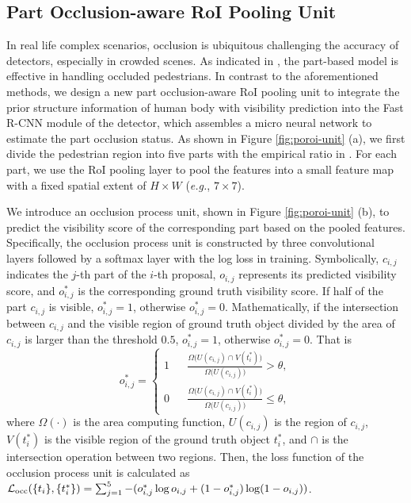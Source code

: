\documentclass[runningheads]{llncs}
\def\eg{{\em e.g.}}
\begin{document}
\subsection{Part Occlusion-aware RoI Pooling Unit}
\label{sec:poroi-unit}
In real life complex scenarios, occlusion is ubiquitous challenging the accuracy of detectors, especially in crowded scenes. As indicated in \cite{DBLP:conf/cvpr/OuyangW12,DBLP:conf/iccv/TianLWT15,DBLP:conf/iccv/ZhouY17}, the part-based model is effective in handling occluded pedestrians. In contrast to the aforementioned methods, we design a new part occlusion-aware RoI pooling unit to integrate the prior structure information of human body with visibility prediction into the Fast R-CNN module of the detector, which assembles a micro neural network to estimate the part occlusion status. As shown in Figure \ref{fig:poroi-unit} (a), we first divide the pedestrian region into five parts with the empirical ratio in \cite{DBLP:journals/pami/FelzenszwalbGMR10}. For each part, we use the RoI pooling layer \cite{DBLP:conf/iccv/Girshick15} to pool the features into a small feature map with a fixed spatial extent of $H\times{W}$ (\eg, $7\times7$).

We introduce an occlusion process unit, shown in Figure \ref{fig:poroi-unit} (b), to predict the visibility score of the corresponding part based on the pooled features. Specifically, the occlusion process unit is constructed by three convolutional layers followed by a softmax layer with the log loss in training. Symbolically, $c_{i,j}$ indicates the $j$-th part of the $i$-th proposal, $o_{i,j}$ represents its predicted visibility score, and $o_{i,j}^\ast$ is the corresponding ground truth visibility score. If half of the part $c_{i,j}$ is visible, $o_{i,j}^\ast=1$, otherwise $o_{i,j}^\ast=0$. Mathematically, if the intersection between $c_{i,j}$ and the visible region of ground truth object divided by the area of $c_{i,j}$ is larger than the threshold $0.5$, $o_{i,j}^\ast=1$, otherwise $o_{i,j}^\ast=0$. That is
\begin{equation}
o_{i,j}^\ast=\left\{
\begin{aligned}
1&    &\frac{\Omega\big(U(c_{i,j})\cap{V(t_i^\ast)}\big)}{\Omega\big(U(c_{i,j})\big)}>\theta, \\
0&    &\frac{\Omega\big(U(c_{i,j})\cap{V(t_i^\ast)}\big)}{\Omega\big(U(c_{i,j})\big)}\leq\theta,
\end{aligned}
\right.
\end{equation}
where $\Omega(\cdot)$ is the area computing function, $U(c_{i,j})$ is the region of $c_{i,j}$, $V(t_i^\ast)$ is the visible region of the ground truth object $t_i^\ast$, and $\cap$ is the intersection operation between two regions. Then, the loss function of the occlusion process unit is calculated as ${\cal L}_{\text{occ}}(\{ t_i \}, \{ t_i^\ast \})=\sum_{j=1}^{5}-(o_{i,j}^\ast\log{o_{i,j}}+(1-o_{i,j}^\ast)\log({1-o_{i,j}}))$.
\end{document}
